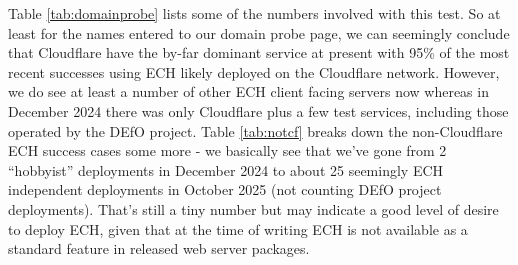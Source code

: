Table \ref{tab:domainprobe} lists some of the numbers involved with this test.
So at least for the names entered to our domain probe page, we can seemingly
conclude that Cloudflare have the by-far dominant service at present with 95\%
of the most recent successes using ECH likely deployed on the Cloudflare
network. However, we do see at least a number of other ECH client facing
servers now whereas in December 2024 there was only Cloudflare plus a few test
services, including those operated by the DEfO project. Table \ref{tab:notcf}
breaks down the non-Cloudflare ECH success cases some more - we basically see
that we've gone from 2 ``hobbyist'' deployments in December 2024 to about 25
seemingly ECH independent deployments in October 2025 (not counting DEfO
project deployments). That's still a tiny number but may indicate a good level
of desire to deploy ECH, given that at the time of writing ECH is not available
as a standard feature in released web server packages.


